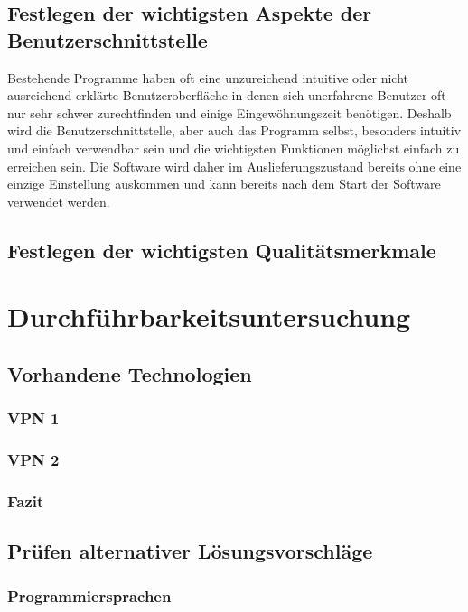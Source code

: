 \documentclass[a4paper,12pt]{scrreprt}
\begin{document}
	\section{Festlegen der wichtigsten Aspekte der Benutzerschnittstelle}
		
		Bestehende Programme haben oft eine unzureichend intuitive oder nicht ausreichend erklärte Benutzeroberfläche in denen sich unerfahrene Benutzer oft nur sehr schwer zurechtfinden und einige Eingewöhnungszeit benötigen. Deshalb wird die Benutzerschnittstelle, aber auch das Programm selbst, besonders intuitiv und einfach verwendbar sein und die wichtigsten Funktionen möglichst einfach zu erreichen sein. Die Software wird daher im Auslieferungszustand bereits ohne eine einzige Einstellung auskommen und kann bereits nach dem Start der Software verwendet werden.
		
	\section{Festlegen der wichtigsten Qualit\"atsmerkmale}
		
\chapter{Durchf\"uhrbarkeitsuntersuchung}

	\section{Vorhandene Technologien}
		
		\subsection{VPN 1}
		
		\subsection{VPN 2}
		
		\subsection{Fazit}
	
	\section{Pr\"ufen alternativer L\"osungsvorschl\"age}
	
		\subsection{Programmiersprachen}
		
\end{document}
